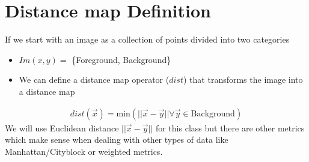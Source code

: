 \documentclass[letterpaper,10pt,english]{sphinxmanual}
\begin{document}
\begin{sphinxVerbatim}[commandchars=\\\{\}]
\end{sphinxVerbatim}

\noindent{}


\section{Distance map \sphinxhyphen{} Definition}
\label{\detokenize{06-AdvancedShapeAndTexture:distance-map-definition}}
\sphinxAtStartPar
If we start with an image as a collection of points divided into two categories
\begin{itemize}
\item {} 
\sphinxAtStartPar
\(Im(x,y)=\) \{Foreground, Background\}

\item {} 
\sphinxAtStartPar
We can define a distance map operator (\(dist\)) that transforms the image into a distance map

\end{itemize}
\begin{equation*}
\begin{split} dist(\vec{x}) = \textrm{min}(||\vec{x}-\vec{y}|| \forall \vec{y} \in \textrm{Background}) \end{split}
\end{equation*}
\sphinxAtStartPar
We will use Euclidean distance \(||\vec{x}-\vec{y}||\) for this class but there are other metrics which make sense when dealing with other types of data like Manhattan/City\sphinxhyphen{}block or weighted metrics.
\end{document}

